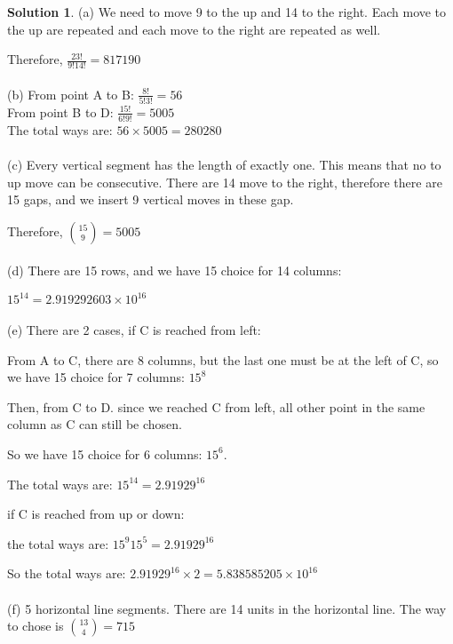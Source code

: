\documentclass{article}
\theoremstyle{definition}
\newtheorem*{solution}{Solution}
\begin{document}
\begin{solution}
(a) We need to move 9 to the up and 14 to the right. Each move to the up are repeated and each move to the right are repeated as well.

Therefore, \(\frac{23!}{9!14!} = 817190\)\\\\

(b) From point A to B: \(\frac{8!}{5!3!} = 56\)\\

From point B to D: \(\frac{15!}{6!9!} = 5005\)\\

The total ways are: \(56\times 5005 = 280280\)\\\\

(c) Every vertical segment has the length of exactly one. This means that no to up move can be consecutive. There are 14 move to the right, therefore there are 15 gaps, and we insert 9 vertical moves in these gap.

Therefore, \(15\choose9\)\( = 5005\)\\\\

(d) There are 15 rows, and we have 15 choice for 14 columns:

\(15^{14} = 2.919292603\times10^{16}\)\\\\

(e) There are 2 cases, if C is reached from left:

From A to C, there are 8 columns, but the last one must be at the left of C, so we have 15 choice for 7 columns: \(15^8\)

Then, from C to D. since we reached C from left, all other point in the same column as C can still be chosen.

So we have 15 choice for 6 columns: \(15^6\).

The total ways are: \(15^{14} = 2.91929^{16}\)

if C is reached from up or down:

the total ways are: \(15^{9}15^5 = 2.91929^{16}\)

So the total ways are: \(2.91929^{16}\times 2 = 5.838585205\times10^{16}\)\\\\

(f) 5 horizontal line segments. There are 14 units in the horizontal line. The way to chose is \(13\choose4\)\( = 715\)


\end{solution}
\end{document}
